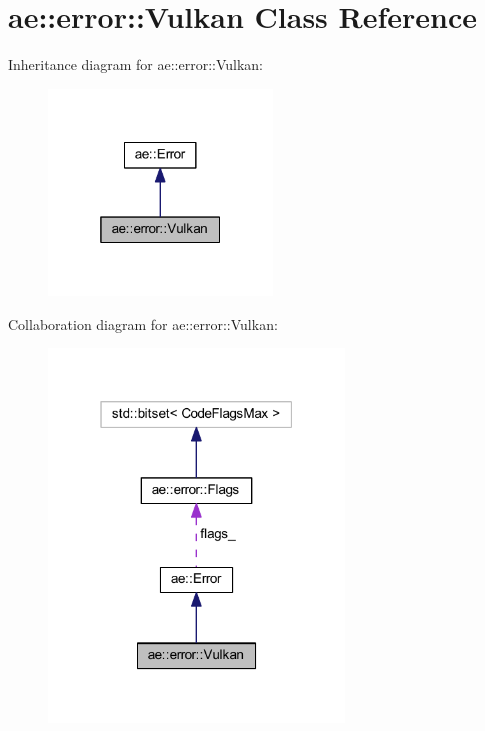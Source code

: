 \hypertarget{classae_1_1error_1_1_vulkan}{}\section{ae\+:\+:error\+:\+:Vulkan Class Reference}
\label{classae_1_1error_1_1_vulkan}


Inheritance diagram for ae\+:\+:error\+:\+:Vulkan\+:
\nopagebreak
\begin{figure}[H]
\begin{center}
\leavevmode
\includegraphics[width=169pt]{classae_1_1error_1_1_vulkan__inherit__graph}
\end{center}
\end{figure}


Collaboration diagram for ae\+:\+:error\+:\+:Vulkan\+:
\nopagebreak
\begin{figure}[H]
\begin{center}
\leavevmode
\includegraphics[width=223pt]{classae_1_1error_1_1_vulkan__coll__graph}
\end{center}
\end{figure}
